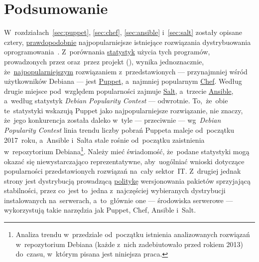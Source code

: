 \documentclass[thesis]{subfiles}
\begin{document}

\section{Podsumowanie}

W~rozdziałach~\ref{sec:puppet}, \ref{sec:chef}, \ref{sec:ansible} i~\ref{sec:salt} zostały opisane cztery, \href{http://www.infoworld.com/article/2609482/data-center/data-center-review-puppet-vs-chef-vs-ansible-vs-salt.html}{prawdopodobnie} najpopularniejsze istniejące rozwiązania dystrybuowania oprogramowania~\cite{leading-scms}. Z~porównania \href{https://www.openhub.net/p/_compare?project_0=Puppet&project_2=salt&project_1=Ansible}{statystyk} użycia tych programów, prowadzonych przez  oraz~przez projekt  (), wynika jednoznacznie, że~\href{https://qa.debian.org/popcon.php?package=puppet}{najpopularniejszym} rozwiązaniem z~przedstawionych --- przynajmniej wśród użytkowników Debiana --- jest \href{https://qa.debian.org/popcon.php?package=puppet}{Puppet}, a~najmniej popularnym \href{https://qa.debian.org/popcon.php?package=chef}{Chef}. Według~ drugie miejsce pod~względem popularności zajmuje \href{https://qa.debian.org/popcon.php?package=salt}{Salt}, a~trzecie \href{https://qa.debian.org/popcon.php?package=ansible}{Ansible}, a~według statystyk \emph{Debian Popularity Contest} --- odwrotnie. To,~że~obie te~statystyki wskazują Puppet jako najpopularniejsze rozwiązanie, nie znaczy, że~jego konkurencja została daleko w~tyle --- przeciwnie --- wg~\emph{Debian Popularity Contest} linia trendu liczby pobrań Puppeta maleje od~początku 2017~roku, a~Ansible i~Salta stale rośnie od~początku zaistnienia w~repozytorium Debiana\footnote{Analiza trendu w~przedziale od~początku istnienia analizowanych rozwiązań w~repozytorium Debiana (każde z~nich zadebiutowało przed rokiem 2013) do~czasu, w~którym pisana jest niniejsza praca.}. Należy mieć świadomość, że~podane statystyki mogą okazać się niewystarczająco reprezentatywne, aby~uogólniać wnioski dotyczące popularności przedstawionych rozwiązań na~cały sektor~IT. Z~drugiej jednak strony \debian{} jest dystrybucją prowadzącą \href{https://www.debian.org/doc/manuals/debian-faq/ch-ftparchives#s-frozen}{politykę} wersjonowania pakietów sprzyjającą stabilności, przez co~jest to~jedna z~najczęściej wybieranych dystrybucji  instalowanych na~serwerach, a~to~głównie one --- środowiska serwerowe --- wykorzystują takie narzędzia jak Puppet, Chef, Ansible i~Salt.
\end{document}
